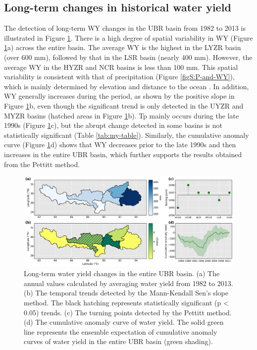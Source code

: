 \documentclass[hess, manuscript]{copernicus}
\begin{document}
\subsection{Long-term changes in historical water yield}
The detection of long-term WY changes in the UBR basin from 1982 to 2013 is illustrated in Figure \ref{fig:water-yield}. There is a high degree of spatial variability in WY (Figure \ref{fig:water-yield}a) across the entire basin. The average WY is the highest in the LYZR basin (over 600 mm), followed by that in the LSR basin (nearly 400 mm). However, the average WY in the HYZR and NCR basins is less than 100 mm. This spatial variability is consistent with that of precipitation (Figure \ref{figS:P-and-WY}), which is mainly determined by elevation and distance to the ocean \citep{sang2016precipitation}. In addition, WY generally increases during the period, as shown by the positive slope in Figure \ref{fig:water-yield}b, even though the significant trend is only detected in the UYZR and MYZR basins (hatched areas in Figure \ref{fig:water-yield}b). Tp mainly occurs during the late 1990s (Figure \ref{fig:water-yield}c), but the abrupt change detected in some basins is not statistically significant (Table \ref{tab:my-table}). Similarly, the cumulative anomaly curve (Figure \ref{fig:water-yield}d) shows that WY decreases prior to the late 1990s and then increases in the entire UBR basin, which further supports the results obtained from the Pettitt method.

\begin{figure}[ht]
    \includegraphics[width=\textwidth]{02-figures/spatial-changes-in-water-yield.png}
    \caption{Long-term water yield changes in the entire UBR basin.
    (a) The annual values calculated by averaging water yield from 1982 to 2013. (b) The temporal trends detected by the Mann-Kendall Sen’s slope method. The black hatching represents statistically significant (p < 0.05) trends. (c) The turning points detected by the Pettitt method. (d) The cumulative anomaly curve of water yield. The solid green line represents the ensemble expectation of cumulative anomaly curves of water yield in the entire UBR basin (green shading).}
    \label{fig:water-yield}
\end{figure}
\end{document}
